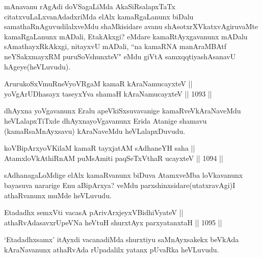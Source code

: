 \begin{artha}
mAnavanu rAgAdi doVSagaLiMda AkaSiRsalapxTaTx citatxvuLaLxvanAdadxriMda elAlx kamaRgaLanunx biDalu samathaRnAguvudilalxveMdu shaMkisidare avanu shAsotxrXVkatxvAgiruvaMte kamaRgaLanunx mADali, EtakAkxgi? eMdare kamaRtAyxgavanunx mADalu sAmathayxRkAkxgi, nitayxvU mADali, ``na kamaRNA manAraMBAtf neYSakxmayxRM puruSoV\s shunxteV" eMdu giVtA samxqqtiyashAsanavU hAgeye(heVLuvudu).
\end{artha}

\begin{shl}
ArurukoSxVmuRneVyoVRgaM kamaR kAraNamucayxteV || \\
yoVgArUDhasayx taseyxYva shamaH kAraNamucayxteV \hfill || 1093 ||  
\end{shl}

\begin{artha}
dhAyxna yoVgavanunx Eralu apeVkiSxsuvavanige kamaRveVkAraNaveMdu heVLalapxTiTxde dhAyxnayoVgavanunx Erida Atanige shamavu (kamaRsaMnAyxsavu) kAraNaveMdu heVLalapxDuvudu.
\end{artha}


\begin{shl}
koV\s BipArxyoV\s KilaM kamaR tayxjatAM sAdhaneYH saha || \\
AtamxloVkAthiRnAM puMsAmiti paqSeTxV\s thaR ucayxteV \hfill || 1094 ||
\end{shl}

\begin{artha}
sAdhanagaLoMdige elAlx kamaRvanunx biDuva AtamxveMba loVkavanunx bayasuva nararige Enu aBipArxya? veMdu parxshinxsidare(utatxravAgi)I athaRvanunx muMde heVLuvudu.
\end{artha}

\begin{shl}
Etadadhx semxVti vacasA pArivArxjeyxV\s BidhiVyateV || \\
athaRvAdasavxrUpeVNa heVtuH shurxtAyx parxyatanxtaH \hfill || 1095 ||  
\end{shl}

\begin{artha}
`Etadadhxsamx' itAyxdi vacanadiMda shurxtiyu saMnAyxsakekx beVkAda kAraNavanunx athaRvAda rUpadalilx yatanx pUvaRka heVLuvudu.
\end{artha}

